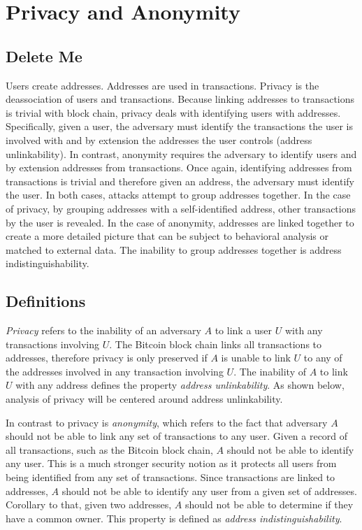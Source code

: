 \section{Privacy and Anonymity}

\subsection{Delete Me}
Users create addresses. Addresses are used in transactions.  Privacy is the deassociation of users and transactions.  Because linking addresses to transactions is trivial with block chain, privacy deals with identifying users with addresses. Specifically, given a user, the adversary must identify the transactions the user is involved with and by extension the addresses the user controls (address unlinkability).
In contrast, anonymity requires the adversary to identify users and by extension addresses from transactions. Once again, identifying addresses from transactions is trivial and therefore given an address, the adversary must identify the user.
In both cases, attacks attempt to group addresses together. In the case of privacy, by grouping addresses with a self-identified address, other transactions by the user is revealed.  In the case of anonymity, addresses are linked together to create a more detailed picture that can be subject to behavioral analysis or matched to external data.  The inability to group addresses together is address indistinguishability.


\subsection{Definitions}
\emph{Privacy} refers to the inability of an adversary $A$ to link a user $U$ with any transactions involving $U$. The Bitcoin block chain links all transactions to addresses, therefore privacy is only preserved if $A$ is unable to link $U$ to any of the addresses involved in any transaction involving $U$. The inability of $A$ to link $U$ with any address defines the property \emph{address unlinkability}. As shown below, analysis of privacy will be centered around address unlinkability.

In contrast to privacy is \emph{anonymity}, which refers to the fact that adversary $A$ should not be able to link any set of transactions to any user. Given a record of all transactions, such as the Bitcoin block chain, $A$ should not be able to identify any user. This is a much stronger security notion as it protects all users from being identified from any set of transactions. Since transactions are linked to addresses, $A$ should not be able to identify any user from a given set of addresses.  Corollary to that, given two addresses, $A$ should not be able to determine if they have a common owner.  This property is defined as \emph{address indistinguishability}.

